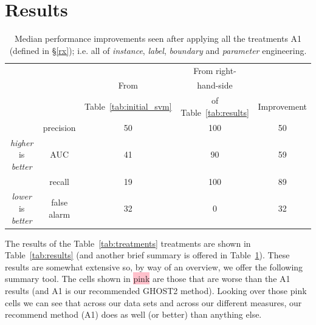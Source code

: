 \section{Results}
\label{sec:results}




\newcommand{\ans}[1]{\underline{\textbf{Answer~#1:}}}


 
 
  \begin{table} 
  \caption{Median performance improvements seen after applying all the treatments A1 (defined in \S\ref{rx}); i.e. all of
{\em instance}, {\em label}, {\em boundary}  and {\em parameter} engineering.}
 \begin{center}
{\scriptsize  \begin{tabular}{|c|c|c|c|c|}\cline{3-5} 
    \multicolumn{2}{c|}{} &       &  From right-& \\ 
    \multicolumn{2}{c|}{} & From     &  hand-side & \\  
     \multicolumn{2}{c|}{} &   Table~\ref{tab:initial_svm}  &  of Table~\ref{tab:results} &  Improvement \\\hline
                             & precision   & 50 & 100 & 50\\ 
{\em higher} is {\em better} & AUC         &  41& 90 & 59\\ 
                             & recall      &  19 & 100 & 89\\\hline
{\em lower} is {\em better}  & false alarm & 32 & 0 & 32\\\hline
\end{tabular}} 
\end{center}
\label{summary}
\end{table}
  
  
  
 




The results of the Table~\ref{tab:treatments} treatments are shown in   Table~\ref{tab:results}
(and 
another brief summary is offered in
Table~\ref{summary}).
These results are somewhat
extensive
  so, by way of an overview, we offer the following summary tool.
 The cells shown in  \colorbox{pink}{pink} are those that are   worse than the A1 results 
  (and A1 is our recommended GHOST2 method). 
 Looking over those pink cells
 we can see that across our data sets and across our different measures, our recommend method (A1) does as well (or better) than anything else. 
 
